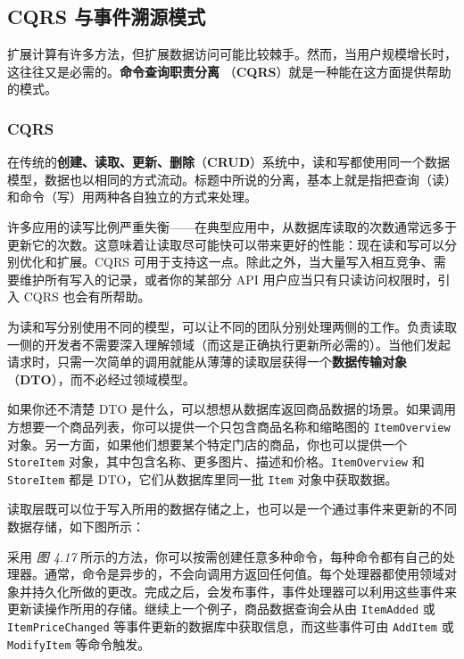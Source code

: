 \subsection{CQRS 与事件溯源模式}

\label{idx:373}
扩展计算有许多方法，但扩展数据访问可能比较棘手。然而，当用户规模增长时，这往往又是必需的。\textbf{命令查询职责分离 }（\textbf{CQRS}）就是一种能在这方面提供帮助的模式。

\subsubsection{CQRS}

\label{idx:374}
在传统的\textbf{创建、读取、更新、删除}（\textbf{CRUD}）系统中，读和写都使用同一个数据模型，数据也以相同的方式流动。标题中所说的分离，基本上就是指把查询（读）和命令（写）用两种各自独立的方式来处理。


\label{idx:375}
许多应用的读写比例严重失衡——在典型应用中，从数据库读取的次数通常远多于更新它的次数。这意味着让读取尽可能快可以带来更好的性能：现在读和写可以分别优化和扩展。CQRS 可用于支持这一点。除此之外，当大量写入相互竞争、需要维护所有写入的记录，或者你的某部分 API 用户应当只有只读访问权限时，引入 CQRS 也会有所帮助。

\label{idx:376}
为读和写分别使用不同的模型，可以让不同的团队分别处理两侧的工作。负责读取一侧的开发者不需要深入理解领域（而这是正确执行更新所必需的）。当他们发起请求时，只需一次简单的调用就能从薄薄的读取层获得一个\textbf{数据传输对象 }（\textbf{DTO}），而不必经过领域模型。

如果你还不清楚 DTO 是什么，可以想想从数据库返回商品数据的场景。如果调用方想要一个商品列表，你可以提供一个只包含商品名称和缩略图的 \texttt{Item\allowbreak{}Overview} 对象。另一方面，如果他们想要某个特定门店的商品，你也可以提供一个 \texttt{StoreItem} 对象，其中包含名称、更多图片、描述和价格。\texttt{Item\allowbreak{}Overview} 和 \texttt{StoreItem} 都是 DTO，它们从数据库里同一批 \texttt{Item} 对象中获取数据。

读取层既可以位于写入所用的数据存储之上，也可以是一个通过事件来更新的不同数据存储，如下图所示：


\label{idx:377}
\label{idx:378}
采用 \emph{图 4.17} 所示的方法，你可以按需创建任意多种命令，每种命令都有自己的处理器。通常，命令是异步的，不会向调用方返回任何值。每个处理器都使用领域对象并持久化所做的更改。完成之后，会发布事件，事件处理器可以利用这些事件来更新读操作所用的存储。继续上一个例子，商品数据查询会从由 \texttt{ItemAdded} 或 \texttt{Item\allowbreak{}Price\allowbreak{}Changed} 等事件更新的数据库中获取信息，而这些事件可由 \texttt{AddItem} 或 \texttt{Modify\allowbreak{}Item} 等命令触发。

